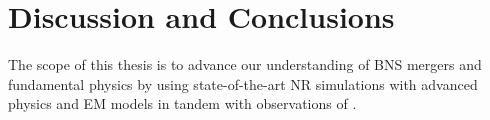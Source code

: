 \chapter{Discussion and Conclusions}\label{ch:conclusion} %













The scope of this thesis is to advance our understanding of \ac{BNS} mergers
and fundamental physics by using state-of-the-art \ac{NR} simulations with
advanced physics and \ac{EM} models in tandem with \mm{} observations of 
\GW{}. 





